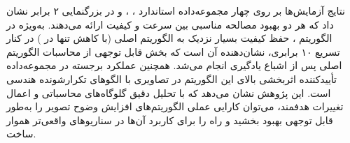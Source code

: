 نتایج آزمایش‌ها بر روی چهار مجموعه‌داده استاندارد ، ،  و  در بزرگنمایی ۲ برابر نشان داد که هر دو بهبود مصالحه مناسبی بین سرعت و کیفیت ارائه می‌دهند. به‌ویژه در الگوریتم ، حفظ کیفیت بسیار نزدیک به الگوریتم اصلی (با کاهش تنها  در ) در کنار تسریع ۱۰ برابری، نشان‌دهنده آن است که بخش قابل توجهی از محاسبات الگوریتم اصلی پس از اشباع یادگیری انجام می‌شد. همچنین عملکرد برجسته  در مجموعه‌داده  تأیید‌کننده اثربخشی بالای این الگوریتم در تصاویری با الگوهای تکرارشونده هندسی است. این پژوهش نشان می‌دهد که با تحلیل دقیق گلوگاه‌های محاسباتی و اعمال تغییرات هدفمند، می‌توان کارایی عملی الگوریتم‌های افزایش وضوح تصویر را به‌طور قابل توجهی بهبود بخشید و راه را برای کاربرد آن‌ها در سناریوهای واقعی‌تر هموار ساخت.
